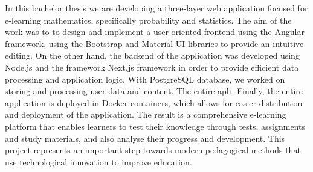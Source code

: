 In this bachelor thesis we are developing a three-layer web application focused
for e-learning mathematics, specifically probability and statistics. The aim of the work was to
to design and implement a user-oriented frontend using the Angular framework,
using the Bootstrap and Material UI libraries to provide an intuitive
editing. On the other hand, the backend of the application was developed using Node.js and the framework
Next.js framework in order to provide efficient data processing and application logic. With PostgreSQL
database, we worked on storing and processing user data and content. The entire apli-
Finally, the entire application is deployed in Docker containers, which allows for easier distribution
and deployment of the application. The result is a comprehensive e-learning platform that enables
learners to test their knowledge through tests, assignments and study materials,
and also analyse their progress and development. This project represents an important step towards
modern pedagogical methods that use technological innovation to improve
education.
